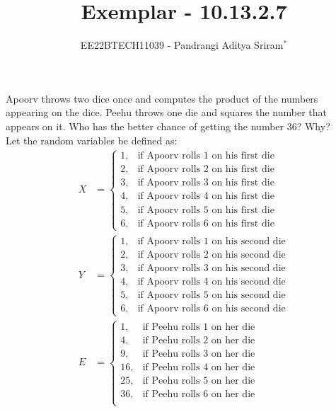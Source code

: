 \documentclass[journal,12pt,twocolumn]{IEEEtran}
\theoremstyle{remark}
\begin{document}

\vspace{3cm}

\title{Exemplar - 10.13.2.7}
\author{EE22BTECH11039 - Pandrangi Aditya Sriram$^{*}$%
}
\maketitle
\newpage
\bigskip

\renewcommand{\thefigure}{\theenumi}
\renewcommand{\thetable}{\theenumi}

Apoorv throws two dice once and computes the product of the numbers appearing
on the dice. Peehu throws one die and squares the number that appears on it. Who
has the better chance of getting the number 36? Why?\\\solution
Let the random variables be defined as:
\begin{align}
    X &=
    \begin{cases}
	1, & \text{if Apoorv rolls 1 on his first die}\\
        2, & \text{if Apoorv rolls 2 on his first die}\\
        3, & \text{if Apoorv rolls 3 on his first die}\\
        4, & \text{if Apoorv rolls 4 on his first die}\\
        5, & \text{if Apoorv rolls 5 on his first die}\\
        6, & \text{if Apoorv rolls 6 on his first die}
    \end{cases}\\
    Y &=
    \begin{cases}
	1, & \text{if Apoorv rolls 1 on his second die}\\
        2, & \text{if Apoorv rolls 2 on his second die}\\
        3, & \text{if Apoorv rolls 3 on his second die}\\
        4, & \text{if Apoorv rolls 4 on his second die}\\
        5, & \text{if Apoorv rolls 5 on his second die}\\
        6, & \text{if Apoorv rolls 6 on his second die}
    \end{cases}\\
    E &=
    \begin{cases}
	1, & \text{if Peehu rolls 1 on her die}\\
        4, & \text{if Peehu rolls 2 on her die}\\
        9, & \text{if Peehu rolls 3 on her die}\\
        16, & \text{if Peehu rolls 4 on her die}\\
        25, & \text{if Peehu rolls 5 on her die}\\
        36, & \text{if Peehu rolls 6 on her die}\\
    \end{cases}
\end{align}
\end{document}
